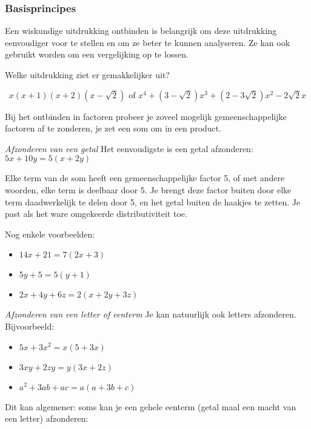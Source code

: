 \subsubsection{Basisprincipes}

Een wiskundige uitdrukking ontbinden is belangrijk om deze uitdrukking eenvoudiger voor te stellen en om ze beter te kunnen analyseren. Ze kan ook gebruikt worden om een vergelijking op te lossen.

Welke uitdrukking ziet er gemakkelijker uit?

\begin{equation*}
x(x+1)(x+2)(x-\sqrt{2}) \text{ of } x^4+(3-\sqrt{2})x^3+(2-3\sqrt{2})x^2-2\sqrt{2}x
\end{equation*}

Bij het ontbinden in factoren probeer je zoveel mogelijk gemeenschappelijke factoren af te zonderen, je zet een som om in een product.

\emph{Afzonderen van een getal}
Het eenvoudigste is een getal afzonderen: $5x+10y=5(x+2y)$

Elke term van de som heeft een gemeenschappelijke factor 5, of met andere woorden, elke term is deelbaar door 5. Je brengt deze factor buiten door elke term daadwerkelijk te delen door 5, en het getal buiten de haakjes te zetten. Je past als het ware omgekeerde distributiviteit toe.

Nog enkele voorbeelden:

\begin{voorbeeld}
\begin{itemize}
	\item $14x+21=7(2x+3)$
	\item $5y+5=5(y+1)$
	\item $2x+4y+6z=2(x+2y+3z)$
\end{itemize}
\end{voorbeeld}

\emph{Afzonderen van een letter of eenterm}
Je kan natuurlijk ook letters afzonderen. Bijvoorbeeld:

\begin{voorbeeld}
	\begin{itemize}
		\item $5x+3x^2=x(5+3x)$
		\item $3xy+2zy=y(3x+2z)$
		\item $a^2+3ab+ac=a(a+3b+c)$
	\end{itemize}
\end{voorbeeld}

Dit kan algemener: soms kan je een gehele eenterm (getal maal een macht van een letter) afzonderen:

